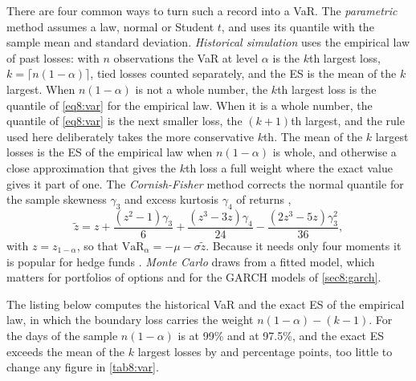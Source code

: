 \begin{chapterrefs}
There are four common ways to turn such a record into a VaR. The \emph{parametric} method assumes a
law, normal or Student $t$, and uses its quantile with the sample mean and standard deviation.
\emph{Historical simulation} uses the empirical law of past losses: with $n$ observations the VaR at
level $\alpha$ is the $k$th largest loss, $k=\lceil n(1-\alpha)\rceil$, tied losses counted separately, and
the ES is the mean of the $k$ largest. When $n(1-\alpha)$ is not a whole number, the $k$th largest loss is
the quantile of \cref{eq8:var} for the empirical law. When it is a whole number, the quantile of
\cref{eq8:var} is the next smaller loss, the $(k+1)$th largest, and the rule used here deliberately
takes the more conservative $k$th. The mean of the $k$ largest losses is the
ES of the empirical law when $n(1-\alpha)$ is whole, and otherwise a close approximation that gives the
$k$th loss a full weight where the exact value gives it part of one. The \emph{Cornish-Fisher} method
corrects the normal quantile for the sample skewness $\gamma_3$ and excess kurtosis $\gamma_4$ of returns
\parencite{cornish1938},
\begin{equation}\label{eq8:cf}
  \tilde z = z + \frac{(z^2-1)\gamma_3}{6} + \frac{(z^3-3z)\gamma_4}{24} - \frac{(2z^3-5z)\gamma_3^2}{36},
\end{equation}
with $z=z_{1-\alpha}$, so that $\mathrm{VaR}_\alpha=-\mu-\sigma\tilde z$. Because it needs only four
moments it is popular for hedge funds \parencite{favre2002}. \emph{Monte Carlo} draws from a fitted model, which matters for portfolios of
options and for the GARCH models of \cref{sec8:garch}.

The listing below computes the historical VaR and the exact ES of the empirical law, in which the
boundary loss carries the weight $n(1-\alpha)-(k-1)$. For the \tdN{} days of the sample $n(1-\alpha)$ is
\esTailN{} at 99\% and \esTailS{} at 97.5\%, and the exact ES exceeds the mean of the $k$ largest losses
by \esGapN{} and \esGapS{} percentage points, too little to change any figure in \cref{tab8:var}.



\end{chapterrefs}
